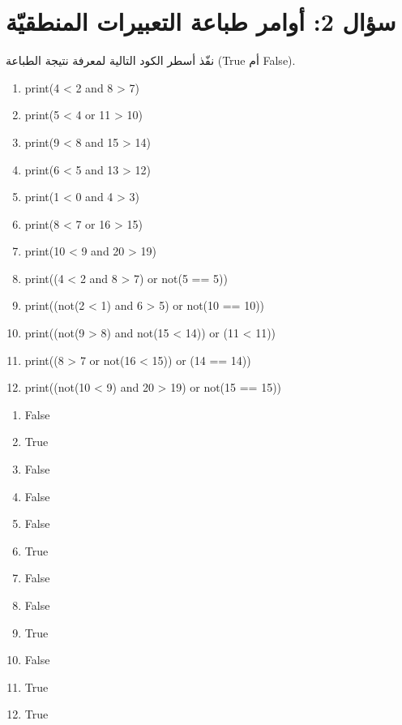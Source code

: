 \documentclass[14pt]{extarticle}
\begin{document}
\section*{سؤال 2: أوامر طباعة التعبيرات المنطقيّة}
نفّذ أسطر الكود التالية لمعرفة نتيجة الطباعة (\textenglish{True} أم \textenglish{False}).
\begin{english}
\begin{enumerate}[label=\arabic*), itemsep=1em]
    \item \textenglish{print(4 < 2 and 8 > 7)}
    \item \textenglish{print(5 < 4 or 11 > 10)}
    \item \textenglish{print(9 < 8 and 15 > 14)}
    \item \textenglish{print(6 < 5 and 13 > 12)}
    \item \textenglish{print(1 < 0 and 4 > 3)}
    \item \textenglish{print(8 < 7 or 16 > 15)}
    \item \textenglish{print(10 < 9 and 20 > 19)}
    \item \textenglish{print((4 < 2 and 8 > 7) or not(5 == 5))}
    \item \textenglish{print((not(2 < 1) and 6 > 5) or not(10 == 10))}
    \item \textenglish{print((not(9 > 8) and not(15 < 14)) or (11 < 11))}
    \item \textenglish{print((8 > 7 or not(16 < 15)) or (14 == 14))}
    \item \textenglish{print((not(10 < 9) and 20 > 19) or not(15 == 15))}
\end{enumerate}
\end{english}

\ifwithsols
\begin{boxSolution}
    \begin{english}
\begin{enumerate}[label=\arabic*)]
    \item \textenglish{False}
    \item \textenglish{True}
    \item \textenglish{False}
    \item \textenglish{False}
    \item \textenglish{False}
    \item \textenglish{True}
    \item \textenglish{False}
    \item \textenglish{False}
    \item \textenglish{True}
    \item \textenglish{False}
    \item \textenglish{True}
    \item \textenglish{True}
\end{enumerate}
\end{english}
\end{boxSolution}
\fi
\clearpage
\end{document}
